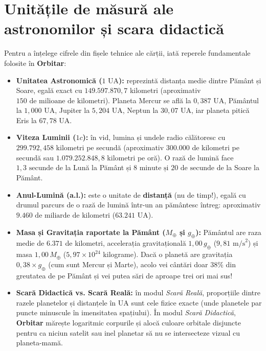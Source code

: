 \section{Unitățile de măsură ale astronomilor și scara didactică}

Pentru a înțelege cifrele din fișele tehnice ale cărții, iată reperele fundamentale folosite în \textbf{Orbitar}:

\begin{tcolorbox}[orbitardata, title={\textbf{Repere Fundamentale de Distanță, Timp și Gravitație în Orbitar}}]
\begin{itemize}[leftmargin=1.4em, itemsep=3pt]
  \item \textbf{Unitatea Astronomică ($1\text{ UA}$):} reprezintă distanța medie dintre Pământ și Soare, egală exact cu $149.597.870{,}7$ kilometri (aproximativ $150\text{ de milioane de kilometri}$). Planeta Mercur se află la $0{,}387\text{ UA}$, Pământul la $1{,}000\text{ UA}$, Jupiter la $5{,}204\text{ UA}$, Neptun la $30{,}07\text{ UA}$, iar planeta pitică Eris la $67{,}78\text{ UA}$.
  \item \textbf{Viteza Luminii ($1c$):} în vid, lumina și undele radio călătoresc cu $299.792{,}458$ kilometri pe secundă (aproximativ $300.000$ de kilometri pe secundă sau $1.079.252.848{,}8$ kilometri pe oră). O rază de lumină face $1{,}3\text{ secunde}$ de la Lună la Pământ și $8\text{ minute și } 20\text{ de secunde}$ de la Soare la Pământ.
  \item \textbf{Anul-Lumină (a.l.):} este o unitate de \textbf{distanță} (nu de timp!), egală cu drumul parcurs de o rază de lumină într-un an pământesc întreg: aproximativ $9.460\text{ de miliarde de kilometri}$ ($63.241\text{ UA}$).
  \item \textbf{Masa și Gravitația raportate la Pământ ($M_\oplus$ și $g_\oplus$):} Pământul are raza medie de $6.371$ de kilometri, accelerația gravitațională $1{,}00\,g_\oplus$ ($9{,}81\text{ m/s}^2$) și masa $1{,}00\,M_\oplus$ ($5{,}97 \times 10^{24}$ kilograme). Dacă o planetă are gravitația $0{,}38 \times g_\oplus$ (cum sunt Mercur și Marte), acolo vei cântări doar $38\%$ din greutatea de pe Pământ și vei putea sări de aproape trei ori mai sus!
  \item \textbf{Scară Didactică vs. Scară Reală:} în modul \emph{Scară Reală}, proporțiile dintre razele planetelor și distanțele în UA sunt cele fizice exacte (unde planetele par puncte minuscule în imensitatea spațiului). În modul \emph{Scară Didactică}, \textbf{Orbitar} mărește logaritmic corpurile și alocă culoare orbitale disjuncte pentru ca niciun satelit sau inel planetar să nu se intersecteze vizual cu planeta-mamă.
\end{itemize}
\end{tcolorbox}

\clearpage
